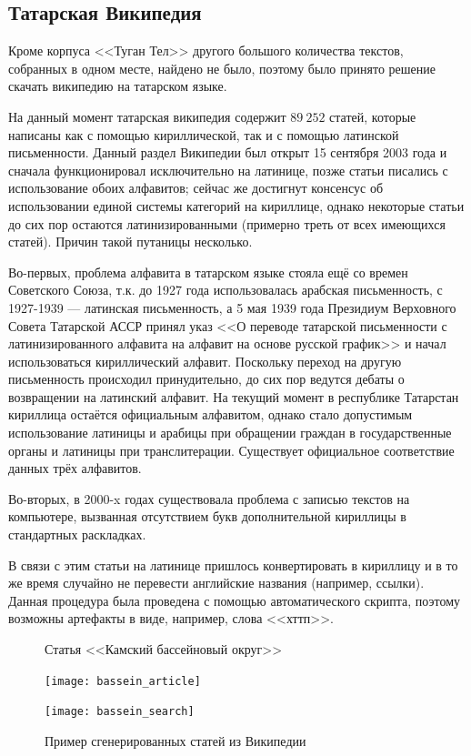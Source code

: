 \subsection{Татарская Википедия}

Кроме корпуса <<Туган Тел>> другого большого количества текстов, собранных в одном месте, найдено не было, поэтому было принято решение скачать википедию на татарском языке.

На данный момент татарская википедия содержит $89\ 252$ статей, которые написаны как с помощью кириллической, так и с помощью латинской письменности. Данный раздел Википедии был открыт 15 сентября 2003 года и сначала функционировал исключительно на латинице, позже статьи писались с использование обоих алфавитов; сейчас же достигнут консенсус об использовании единой системы категорий на кириллице, однако некоторые статьи до сих пор остаются латинизированными (примерно треть от всех имеющихся статей). Причин такой путаницы несколько. 

Во-первых, проблема алфавита в татарском языке стояла ещё со времен Советского Союза, т.к. до 1927 года использовалась арабская письменность, с 1927-1939 --- латинская письменность, а 5 мая 1939 года Президиум Верховного Совета Татарской АССР принял указ <<О переводе татарской письменности с латинизированного алфавита на алфавит на основе русской график>> и начал использоваться кириллический алфавит. Поскольку переход на другую письменность происходил принудительно, до сих пор ведутся дебаты о возвращении на латинский алфавит. На текущий момент в республике Татарстан кириллица остаётся официальным алфавитом, однако стало допустимым использование латиницы и арабицы при обращении граждан в государственные органы и латиницы при транслитерации. Существует официальное соответствие данных трёх алфавитов.

Во-вторых, в 2000-x годах существовала проблема с записью текстов на компьютере, вызванная отсутствием букв дополнительной кириллицы в стандартных раскладках.

В связи с этим статьи на латинице пришлось конвертировать в кириллицу и в то же время случайно не перевести английские названия (например, ссылки). Данная процедура была проведена с помощью автоматического скрипта, поэтому возможны артефакты в виде, например, слова <<хттп>>.

\begin{figure}[H]
\begin{minipage}{\textwidth}
\caption{Статья <<Камский бассейновый округ>>}
\texttt{[image: bassein\_article]}
\label{fig:bassein_article}
\end{minipage}

\begin{minipage}{\textwidth}
\caption{Пример сгенерированных статей из Википедии}
\texttt{[image: bassein\_search]}
\label{fig:bassein_search}
\end{minipage}
\end{figure}


